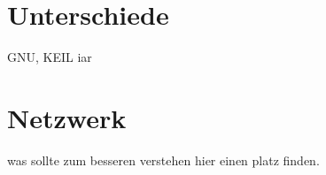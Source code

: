 \section{Unterschiede}
GNU, KEIL iar

\section{Netzwerk}
was sollte zum besseren verstehen hier einen platz finden.


